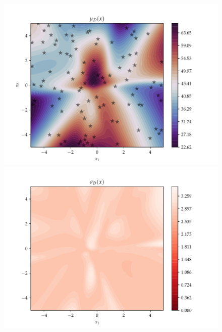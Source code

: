 \begin{figure}[h]
  \centering
  \begin{minipage}[b]{0.49\textwidth}
   \includegraphics[trim=1.2cm 0.7cm 2cm 1cm,clip,width=\textwidth]{Figures/coco_reg/f23_BOHAMIANN2.pdf}
  \end{minipage}
  \hfill
  \begin{minipage}[b]{0.49\textwidth}
    \includegraphics[trim=1.2cm 0.7cm 2cm 1cm,clip,width=\textwidth]{Figures/coco_reg/f23_BOHAMIANN3.pdf}
   \end{minipage}
  

\end{figure}
